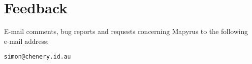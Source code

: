 
\section{Feedback}

E-mail comments, bug reports and requests concerning Mapyrus to
the following e-mail address:

\begin{verbatim}
simon@chenery.id.au
\end{verbatim}

